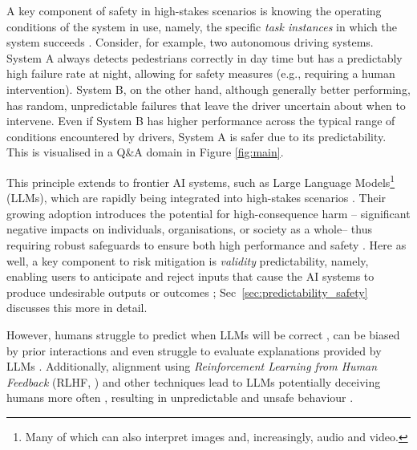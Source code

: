 \documentclass[11pt]{article}
\begin{document}
A key component of safety in high-stakes scenarios is  knowing the operating conditions of the system in use, namely, the specific \textit{task instances} in which the system succeeds \cite{leveson2002system, bahr2014system, hendrickx2024machine, zhou2024predictableartificialintelligence}. %
Consider, for example, two autonomous driving systems. System A always detects pedestrians correctly in day time but has a predictably high failure rate at night, allowing for safety measures (e.g., requiring a human intervention). System B, on the other hand, although generally better performing, has random, unpredictable failures that leave the driver uncertain about when to intervene. Even if System B has higher performance across the typical range of conditions encountered by drivers, System A is safer due to its predictability. This is visualised in a Q\&A domain in Figure \ref{fig:main}. %

This principle extends to frontier AI systems, such as Large Language Models\footnote{Many of which can also interpret images and, increasingly, audio and video.} (LLMs), which are rapidly being integrated into high-stakes scenarios \citep{kim2024language,huang2024benchmarking,javaid2024large}. Their growing adoption introduces the potential for high-consequence harm -- significant negative impacts on individuals, organisations, or society as a whole-- thus requiring robust safeguards to ensure both high performance and safety \cite{hendrycks2023overviewcatastrophicairisks}. Here as well, a key component to risk mitigation is {\em validity} predictability, namely, enabling users to anticipate and reject inputs that cause the AI systems to produce undesirable outputs or outcomes \cite{zhou2024predictableartificialintelligence, hendrickx2024machine, vafa2024largelanguagemodelsperform}; Sec~\ref{sec:predictability_safety} discusses this more in detail.

However, 
humans struggle to predict when LLMs will be correct \citep{carlini_gpt4_challenge}, can be biased by prior interactions \citep{vafa2024largelanguagemodelsperform} and even struggle to evaluate explanations provided by LLMs \citep{steyvers2025large}. 
Additionally, alignment using \textit{Reinforcement Learning from Human Feedback} (RLHF, \citealp{ouyang2022training}) and other techniques lead to LLMs potentially deceiving humans more often \citep{wen2024languagemodelslearnmislead, williams2024targeted}, %
resulting in unpredictable and unsafe behaviour %
\citep{anwar2024foundationalchallengesassuringalignment, zhou2024larger}.  
\end{document}
